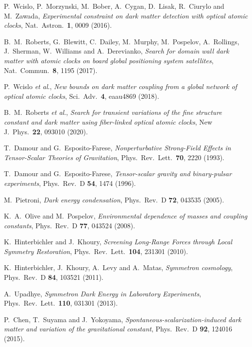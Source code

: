 \documentclass[aps,prd,onecolumn,nofootinbib]{revtex4-2} %
\begin{document}
\begin{thebibliography}{99}
 P.~Wcislo, P.~Morzynski, M.~Bober, A.~Cygan, D.~Lisak, R.~Ciurylo and M.~Zawada, \textit{Experimental constraint on dark matter detection with optical atomic clocks}, Nat.~Astron.~\textbf{1}, 0009 (2016). 

 B.~M.~Roberts, G.~Blewitt, C.~Dailey, M.~Murphy, M.~Pospelov, A.~Rollings, J.~Sherman, W.~Williams and A.~Derevianko, \textit{Search for domain wall dark matter with atomic clocks on board global positioning system satellites}, Nat.~Commun.~\textbf{8}, 1195 (2017). 

 P.~Wcislo \textit{et al}., \textit{New bounds on dark matter coupling from a global network of optical atomic clocks}, Sci.~Adv.~\textbf{4}, eaau4869 (2018). 

 B.~M.~Roberts \textit{et al}., \textit{Search for transient variations of the fine structure constant and dark matter using fiber-linked optical atomic clocks}, New J.~Phys.~\textbf{22}, 093010 (2020). 


 T.~Damour and G.~Esposito-Farese, \textit{Nonperturbative Strong-Field Effects in Tensor-Scalar Theories of Gravitation}, Phys.~Rev.~Lett.~\textbf{70}, 2220 (1993). 

 T.~Damour and G.~Esposito-Farese, \textit{Tensor-scalar gravity and binary-pulsar experiments}, Phys.~Rev.~D \textbf{54}, 1474 (1996). 

 M.~Pietroni, \textit{Dark energy condensation}, Phys.~Rev.~D \textbf{72}, 043535 (2005). 

 K.~A.~Olive and M.~Pospelov, \textit{Environmental dependence of masses and coupling constants}, Phys.~Rev.~D \textbf{77}, 043524 (2008). 

 K.~Hinterbichler and J.~Khoury, \textit{Screening Long-Range Forces through Local Symmetry Restoration}, Phys.~Rev.~Lett.~\textbf{104}, 231301 (2010). 

 K.~Hinterbichler, J.~Khoury, A.~Levy and A.~Matas, \textit{Symmetron cosmology}, Phys.~Rev.~D \textbf{84}, 103521 (2011). 

 A.~Upadhye, \textit{Symmetron Dark Energy in Laboratory Experiments}, Phys.~Rev.~Lett.~\textbf{110}, 031301 (2013). 


 P.~Chen, T.~Suyama and J.~Yokoyama, \textit{Spontaneous-scalarization-induced dark matter and variation of the gravitational constant}, Phys.~Rev.~D \textbf{92}, 124016 (2015). 


\end{thebibliography}
\end{document}

